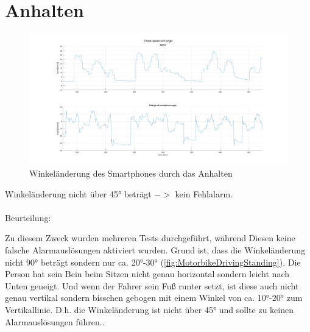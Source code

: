 \section{Anhalten}

\begin{figure}[H]
	\centering
	\includegraphics[width=\linewidth]{Bilder/Speed_AngleChangeCompare.png}
	\caption{Winkeländerung des Smartphones durch das Anhalten}
	\label{fig:Speed_AngleChangeCompare}
\end{figure}
Winkeländerung nicht über \ang{45} beträgt $->$ kein Fehlalarm.\\
\\
Beurteilung:

Zu diesem Zweck wurden mehreren Tests durchgeführt, während Diesen keine falsche Alarmauslösungen aktiviert wurden. Grund ist, dass die Winkeländerung nicht \ang{90} beträgt sondern nur ca. \ang{20}-\ang{30} (\autoref{fig:MotorbikeDrivingStanding}). Die Person hat sein Bein beim Sitzen nicht genau horizontal sondern leicht nach Unten geneigt. Und wenn der Fahrer sein Fuß runter setzt, ist diese auch nicht genau vertikal sondern bisschen gebogen mit einem Winkel von ca. \ang{10}-\ang{20} zum Vertikallinie. D.h. die Winkeländerung ist nicht über \ang{45} und sollte zu keinen Alarmauslösungen führen..

